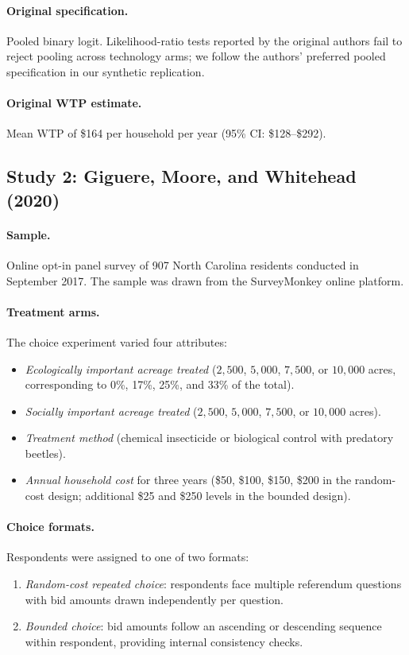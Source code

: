 \documentclass[12pt]{article}
\begin{document}
\paragraph{Original specification.} Pooled binary logit. Likelihood-ratio tests reported by the original authors fail to reject pooling across technology arms; we follow the authors' preferred pooled specification in our synthetic replication.

\paragraph{Original WTP estimate.} Mean WTP of \$164 per household per year (95\% CI: \$128--\$292).

\subsection{Study 2: Giguere, Moore, and Whitehead (2020)}

\paragraph{Sample.} Online opt-in panel survey of 907 North Carolina residents conducted in September 2017. The sample was drawn from the SurveyMonkey online platform.

\paragraph{Treatment arms.} The choice experiment varied four attributes:
\begin{itemize}[noitemsep]
    \item \textit{Ecologically important acreage treated} ($2{,}500$, $5{,}000$, $7{,}500$, or $10{,}000$ acres, corresponding to 0\%, 17\%, 25\%, and 33\% of the total).
    \item \textit{Socially important acreage treated} ($2{,}500$, $5{,}000$, $7{,}500$, or $10{,}000$ acres).
    \item \textit{Treatment method} (chemical insecticide or biological control with predatory beetles).
    \item \textit{Annual household cost} for three years (\$50, \$100, \$150, \$200 in the random-cost design; additional \$25 and \$250 levels in the bounded design).
\end{itemize}

\paragraph{Choice formats.} Respondents were assigned to one of two formats:
\begin{enumerate}[noitemsep]
    \item \textit{Random-cost repeated choice}: respondents face multiple referendum questions with bid amounts drawn independently per question.
    \item \textit{Bounded choice}: bid amounts follow an ascending or descending sequence within respondent, providing internal consistency checks.
\end{enumerate}
\end{document}
